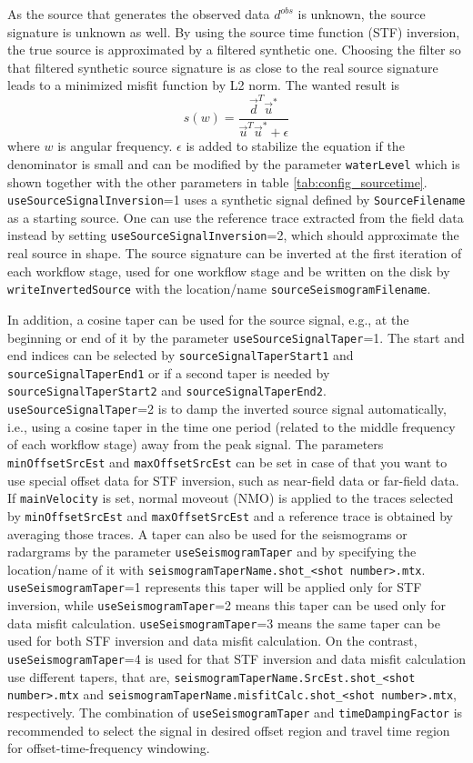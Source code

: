\documentclass[pdftex,a4paper,parskip,listof=totoc,bibliography=totoc,onehalfspacing,12pt]{scrreprt}
\begin{document}
As the source that generates the observed data $d^{obs}$ is unknown, the source signature is unknown as well. By using the source time function (STF) inversion, the true source is approximated by a filtered synthetic one. Choosing the filter so that filtered synthetic source signature is as close to the real source signature leads to a minimized misfit function by L2 norm. The wanted result is 
\begin{equation*}
 s(w)=\dfrac{\vec{d}^T\vec{u}^*}{\vec{u}^T\vec{u}^*+\epsilon}
\end{equation*}
where $w$ is angular frequency. $\epsilon$ is added to stabilize the equation if the denominator is small and can be modified by the parameter \verb+waterLevel+ which is shown together with the other parameters in table \ref{tab:config_sourcetime}.  \verb+useSourceSignalInversion+=1 uses a synthetic signal defined by \verb+SourceFilename+ as a starting source. One can use the reference trace extracted from the field data instead by setting \verb+useSourceSignalInversion+=2, which should approximate the real source in shape. The source signature can be inverted at the first iteration of each workflow stage, used for one workflow stage and be written on the disk by \verb+writeInvertedSource+ with the location/name \verb+sourceSeismogramFilename+.

In addition, a cosine taper can be used for the source signal, e.g., at the beginning or end of it by the parameter \verb+useSourceSignalTaper+=1. The start and end indices can be selected by \verb+sourceSignalTaperStart1+ and \verb+sourceSignalTaperEnd1+ or if a second taper is needed by \verb+sourceSignalTaperStart2+ and \verb+sourceSignalTaperEnd2+. \verb+useSourceSignalTaper+=2 is to damp the inverted source signal automatically, i.e., using a cosine taper in the time one period (related to the middle frequency of each workflow stage) away from the peak signal. The parameters \verb+minOffsetSrcEst+ and \verb+maxOffsetSrcEst+ can be set in case of that you want to use special offset data for STF inversion, such as near-field data or far-field data. If \verb+mainVelocity+ is set, normal moveout (NMO) is applied to the traces selected by \verb+minOffsetSrcEst+ and \verb+maxOffsetSrcEst+ and a reference trace is obtained by averaging those traces.
A taper can also be used for the seismograms or radargrams by the parameter \verb+useSeismogramTaper+ and by specifying the location/name of it with \verb+seismogramTaperName.shot_<shot number>.mtx+. \verb+useSeismogramTaper+=1 represents this taper will be applied only for STF inversion, while \verb+useSeismogramTaper+=2 means this taper can be used only for data misfit calculation. \verb+useSeismogramTaper+=3 means the same taper can be used for both STF inversion and data misfit calculation.  On the contrast, \verb+useSeismogramTaper+=4 is used for that STF inversion and data misfit calculation use different tapers, that are,  \verb+seismogramTaperName.SrcEst.shot_<shot number>.mtx+ and \verb+seismogramTaperName.misfitCalc.shot_<shot number>.mtx+, respectively. The combination of \verb+useSeismogramTaper+ and \verb+timeDampingFactor+ is recommended to select the signal in desired offset region and travel time region for offset-time-frequency windowing.
\end{document}
